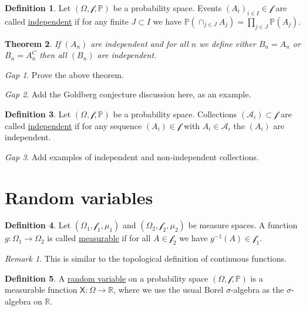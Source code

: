 \documentclass[11pt]{article}
\newcommand{\col}[1]{\mathscr{#1}}
\newcommand{\rv}[1]{\mathsf{#1}}
\newcommand{\p}{\mathbb{P}}
\newcommand{\defname}[1]{\underline{#1}}
\newcommand{\RR}{\mathbb{R}}
\theoremstyle{theorem}
\newtheorem{theorem}{Theorem}[section]
\theoremstyle{definition}
\newtheorem{definition}[theorem]{Definition}
\theoremstyle{remark}
\newtheorem*{remark}{Remark}
\theoremstyle{step}
\theoremstyle{gap}
\newtheorem*{gap}{Gap}
\begin{document}
\begin{definition}
Let \((\Omega, \col{f}, \p)\) be a probability space. Events \((A_i)_{i \in I} \in \col{f}\) are called \defname{independent} if for any finite \(J \subset I\) we have \(\p\left(\cap_{j \in J} A_j\right) = \prod_{j \in J} \p\left(A_j\right)\).
\end{definition}

\begin{theorem}
If \((A_n)\) are independent and for all \(n\) we define either \(B_n = A_n\) or \(B_n = A_n^C\) then all \((B_n)\) are independent.
\end{theorem}

\begin{gap}
Prove the above theorem.
\end{gap}

\begin{gap}
Add the Goldberg conjecture discussion here, as an example.
\end{gap}

\begin{definition}
Let \((\Omega, \col{f}, \p)\) be a probability space. Collections \((\col{A}_i) \subset \col{f}\) are called \defname{independent} if for any sequence \((A_i)\in\col{f}\) with \(A_i \in \col{A}_i\) the \((A_i)\) are independent.
\end{definition}

\begin{gap}
Add examples of independent and non-independent collections.
\end{gap}


\section{Random variables}

\begin{definition}
Let \((\Omega_1, \col{f}_1, \mu_1)\) and \((\Omega_2, \col{f}_2, \mu_2)\) be measure spaces. A function \(g: \Omega_1 \to \Omega_2\) is called \defname{measurable} if for all \(A \in \col{f}_2\) we have \(g^{-1}(A) \in \col{f}_1\).
\end{definition}

\begin{remark}
This is similar to the topological definition of continuous functions.
\end{remark}


\begin{definition}
A \defname{random variable} on a probability space \((\Omega, \col{f}, \p)\) is a measurable function \(\rv{X}:\Omega \to \RR\), where we use the usual Borel \(\sigma\)-algebra as the \(\sigma\)-algebra on \(\RR\).
\end{definition}
\end{document}
